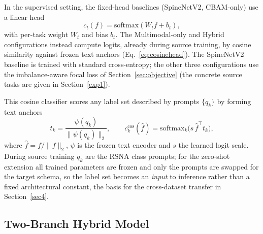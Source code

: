 \documentclass[runningheads]{llncs}
\begin{document}
In the supervised setting, the fixed-head baselines (SpineNetV2, CBAM-only) use a linear head
\begin{equation}
c_t(f) = \mathrm{softmax}(W_t f + b_t),
\label{eq:linhead}
\end{equation}
with per-task weight $W_t$ and bias $b_t$. The Multimodal-only and Hybrid configurations instead compute logits, already during source training, by cosine similarity against frozen text anchors (Eq.~\ref{eq:cosinehead}). The SpineNetV2 baseline is trained with standard cross-entropy; the other three configurations use the imbalance-aware focal loss of Section~\ref{sec:objective} (the concrete source tasks are given in Section~\ref{exp1}).

This cosine classifier scores any label set described by prompts $\{q_k\}$ by forming text anchors
\begin{equation}
t_k = \frac{\psi(q_k)}{\|\psi(q_k)\|_2},
\qquad
c^{\text{cos}}_k(\hat f) = \mathrm{softmax}_k\!\big(s\,\hat f^{\top} t_k\big),
\label{eq:cosinehead}
\end{equation}
where $\hat f = f/\|f\|_2$, $\psi$ is the frozen text encoder and $s$ the learned logit scale. During source training $q_k$ are the RSNA class prompts; for the zero-shot extension all trained parameters are frozen and only the prompts are swapped for the target schema, so the label set becomes an \emph{input} to inference rather than a fixed architectural constant, the basis for the cross-dataset transfer in Section~\ref{sec4}.

\subsection{Two-Branch Hybrid Model}\label{wf}
\end{document}
